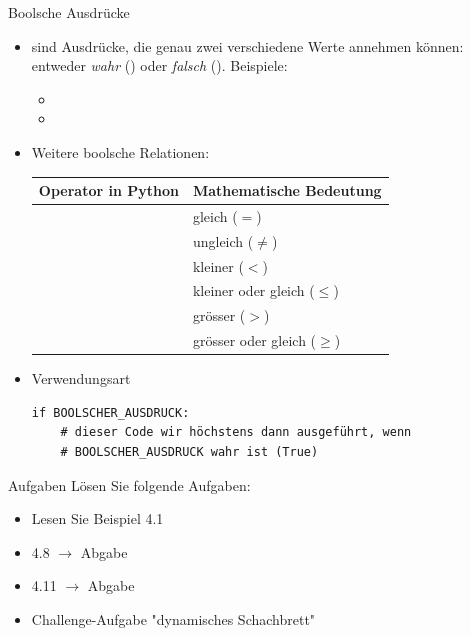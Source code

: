 \begin{frame}[fragile]{Boolsche Ausdrücke}
\begin{itemize}
    \item {} sind Ausdrücke, die genau zwei verschiedene Werte annehmen können: entweder \textit{wahr} () oder \textit{falsch} (). Beispiele:
    \begin{itemize}
        \item {}
        \item {}
    \end{itemize}
    \item Weitere boolsche Relationen:
    \begin{table}[H]
        \centering
        \begin{tabular}{r|l}
        \textbf{Operator in Python} & \textbf{Mathematische Bedeutung} \\\midrule 
             \pythoninline{==} & gleich ($=$)\\
             \pythoninline{!=} & ungleich ($\neq$) \\
             \pythoninline{<} & kleiner ($<$)\\
             \pythoninline{<=} & kleiner oder gleich ($\leq$) \\
             \pythoninline{>} & grösser ($>$) \\
             \pythoninline{>=} & grösser oder gleich ($\geq$)
        \end{tabular}
    \end{table}
    \item Verwendungsart
\begin{lstlisting}[style=TigerJython]
if BOOLSCHER_AUSDRUCK:
    # dieser Code wir höchstens dann ausgeführt, wenn 
    # BOOLSCHER_AUSDRUCK wahr ist (True)
\end{lstlisting}
\end{itemize}
   
\end{frame}

\begin{frame}{Aufgaben}
Lösen Sie folgende Aufgaben:
\begin{itemize}
    \item Lesen Sie Beispiel 4.1
    \item 4.8 $\rightarrow$ Abgabe
    \item 4.11 $\rightarrow$ Abgabe
    \item {} Challenge-Aufgabe "dynamisches Schachbrett"
\end{itemize}

\end{frame}
